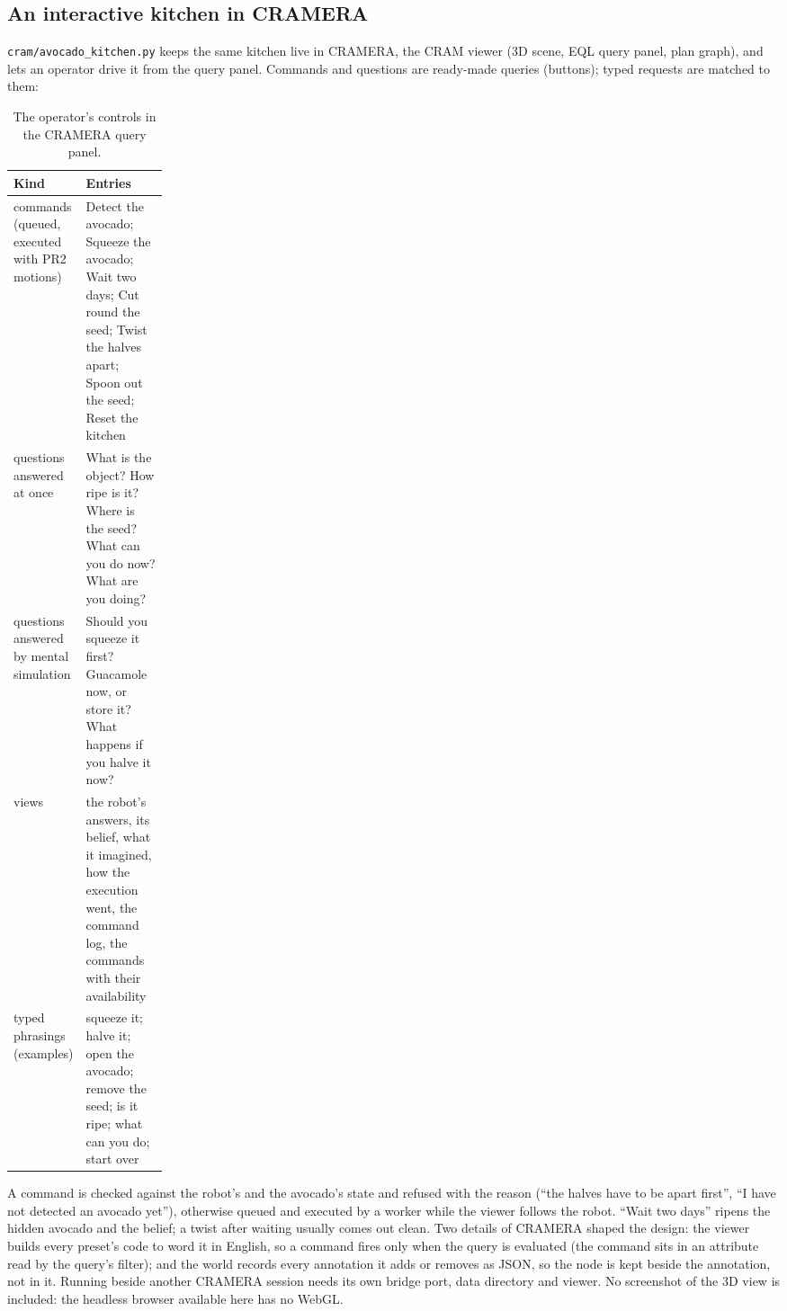 \documentclass[10.5pt,a4paper]{article}
\begin{document}
\subsection{An interactive kitchen in CRAMERA}
\texttt{cram/avocado\_kitchen.py} keeps the same kitchen live in CRAMERA, the CRAM viewer (3D scene, EQL query panel,
plan graph), and lets an operator drive it from the query panel. Commands and questions are ready-made queries
(buttons); typed requests are matched to them:
\begin{table}[htbp]\centering\scriptsize\caption{The operator's controls in the CRAMERA query panel.}
\begin{tabularx}{\linewidth}{@{}p{0.2\linewidth}X@{}}\toprule Kind & Entries \\\midrule
commands (queued, executed with PR2 motions) & Detect the avocado; Squeeze the avocado; Wait two days; Cut round the seed; Twist the halves apart; Spoon out the seed; Reset the kitchen \\
questions answered at once & What is the object? How ripe is it? Where is the seed? What can you do now? What are you doing? \\
questions answered by mental simulation & Should you squeeze it first? Guacamole now, or store it? What happens if you halve it now? \\
views & the robot's answers, its belief, what it imagined, how the execution went, the command log, the commands with their availability \\
typed phrasings (examples) & squeeze it; halve it; open the avocado; remove the seed; is it ripe; what can you do; start over \\\bottomrule\end{tabularx}\end{table}
A command is checked against the robot's and the avocado's state and refused with the reason (``the halves
have to be apart first'', ``I have not detected an avocado yet''), otherwise queued and executed by a worker while
the viewer follows the robot. ``Wait two days'' ripens the hidden avocado and the belief; a twist after waiting
usually comes out clean. Two details of CRAMERA shaped the design: the viewer builds every preset's code to word it
in English, so a command fires only when the query is evaluated (the command sits in an attribute read by the query's
filter); and the world records every annotation it adds or removes as JSON, so the node is kept beside the
annotation, not in it. Running beside another CRAMERA session needs its own bridge port, data directory and viewer.
No screenshot of the 3D view is included: the headless browser available here has no WebGL.
\end{document}
